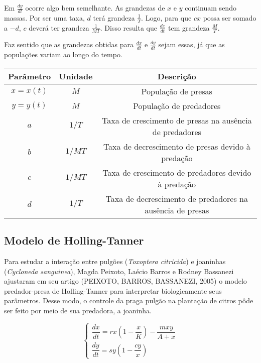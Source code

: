 Em $\frac{dy}{dt}$ ocorre algo bem semelhante. As grandezas de $x$ e $y$ continuam sendo massas. Por ser uma taxa, $d$ terá grandeza $\frac{1}{T}$. Logo, para que $cx$ possa ser somado a $-d$, $c$ deverá ter grandeza $\frac{1}{MT}$. Disso resulta que $\frac{dx}{dt}$ tem grandeza $\frac{M}{T}$.

Faz sentido que as grandezas obtidas para $\frac{dx}{dt}$ e $\frac{dy}{dt}$ sejam essas, já que as populações variam ao longo do tempo.

\begin{center}
\begin{tabular}{| c | c | c |}
\hline
Parâmetro & Unidade & Descrição\\
\hline
$x=x(t)$ & $M$ & População de presas\\
$y=y(t)$ & $M$ & População de predadores\\
$a$ & $1/T$ & Taxa de crescimento de presas na ausência de predadores\\
$b$ & $1/MT$ & Taxa de decrescimento de presas devido à predação\\
$c$ & $1/MT$ & Taxa de crescimento de predadores devido à predação\\
$d$ & $1/T$ & Taxa de decrescimento de predadores na ausência de presas\\
\hline
\end{tabular}
\end{center}

\newpage

\subsection{Modelo de Holling-Tanner}

Para estudar a interação entre pulgões (\textit{Toxoptera citricida}) e joaninhas (\textit{Cycloneda sanguinea}), Magda Peixoto, Laécio Barros e Rodney Bassanezi ajustaram em seu artigo (PEIXOTO, BARROS, BASSANEZI, 2005) \cite{mp_lb_rb_2005} o modelo predador-presa de Holling-Tanner para interpretar biologicamente seus parâmetros. Desse modo, o controle da praga pulgão na plantação de citros pôde ser feito por meio de sua predadora, a joaninha.

$$\left\{
\begin{array}{l}
\dfrac{dx}{dt}=rx\left(1-\dfrac{x}{K}\right)-\dfrac{mxy}{A+x}\\
\dfrac{dy}{dt}=sy\left(1-\dfrac{cy}{x}\right)
\end{array}
\right.$$

